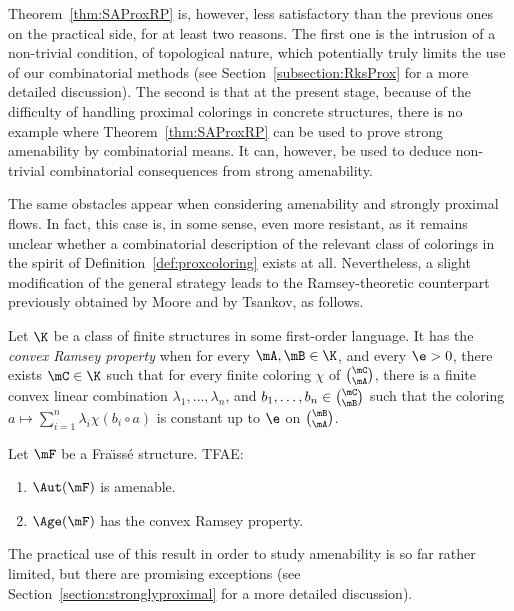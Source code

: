Theorem~\ref{thm:SAProxRP} is, however, less satisfactory than the previous ones on the practical side, for at least two reasons. The first one is the intrusion of a non-trivial condition, of topological nature, which potentially truly limits the use of our combinatorial methods (see Section~\ref{subsection:RksProx} for a more detailed discussion). The second is that at the present stage, because of the difficulty of handling proximal colorings in concrete structures, there is no example where Theorem~\ref{thm:SAProxRP} can be used to prove strong amenability by combinatorial means. It can, however, be used to deduce non-trivial combinatorial consequences from strong amenability.

The same obstacles appear when considering amenability and strongly proximal flows. In fact, this case is, in some sense, even more resistant, as it remains unclear whether a combinatorial description of the relevant class of colorings in the spirit of Definition~\ref{def:proxcoloring} exists at all. Nevertheless, a slight modification of the general strategy leads to the Ramsey-theoretic counterpart previously obtained by Moore and by Tsankov, as follows.

\begin{defi}

Let $\K$ be a class of finite structures in some first-order language. It has the \emph{convex Ramsey property} when for every $\mA, \mB \in \K$, and every $\e>0$, there exists $\mC\in \K$ such that for every finite coloring $\chi$ of $\binom{\mC}{\mA}$, there is a finite convex linear combination $\lambda_{1},\ldots,\lambda_{n}$, and $b_{1},\ldots,b_{n}\in \binom{\mC}{\mB}$ such that the coloring $a\mapsto \sum_{i=1}^{n}\lambda_{i}\chi(b_{i}\circ a)$ is constant up to $\e$ on $\binom{\mB}{\mA}$.
\end{defi}

\begin{theo}
\label{thm:AConvexRP}

Let $\mF$ be a Fra\"{\i}ss\'e structure. TFAE:
\begin{enumerate}
\item $\Aut(\mF)$ is amenable.
\item $\Age(\mF)$ has the convex Ramsey property.
\end{enumerate}
\end{theo}

The practical use of this result in order to study amenability is so far rather limited, but there are promising exceptions (see Section~\ref{section:stronglyproximal} for a more detailed discussion).

